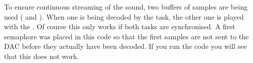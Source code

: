 To ensure continuous streaming of the sound, two buffers of samples are being used ( and ). 
When one is being decoded by the  task, the other one is played with the . 
Of course this only works if both tasks are synchronised.
A first semaphore was placed in this code so that the first samples are not sent to the DAC before they actually have been decoded.
If you run the code you will see that this does not work.

